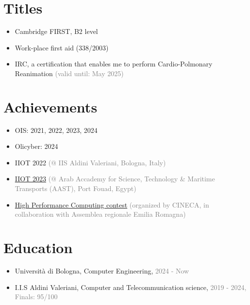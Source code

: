 \documentclass{paper}
\begin{document}
\section{Titles}

\begin{itemize}
    \item Cambridge FIRST, B2 level
    \item Work-place first aid (338/2003)
    \item IRC, a certification that enables me to perform Cardio-Polmonary Reanimation \textcolor{gray}{(valid until: May 2025)}
\end{itemize}

\section{Achievements}

\begin{itemize}
    \item OIS: 2021, 2022, 2023, 2024
    \item Olicyber: 2024

    \item IIOT 2022 \textcolor{gray}{(@ IIS Aldini Valeriani, Bologna, Italy)}
    \item \href{https://forum.olinfo.it/t/iiot-2023-diary/8278}{IIOT 2023} \textcolor{gray}{(@ Arab Accademy for Science, Technology \& Maritime Transports (AAST), Port Fouad, Egypt)}

    \item \href{https://www.ilrestodelcarlino.it/bologna/cronaca/sfida-tra-studenti-sul-supercalcolo-vincono-le-scuole-aldini-valeriani-8638a766}{High Performance Computing contest} \textcolor{gray}{(organized by CINECA, in collaboration with Assemblea regionale Emilia Romagna)}
\end{itemize}

\section{Education}

\begin{itemize}
    \item Università di Bologna, Computer Engineering, \textcolor{gray}{2024 - Now}
    \item I.I.S Aldini Valeriani, Computer and Telecommunication science, \textcolor{gray}{2019 - 2024, Finals: 95/100}
\end{itemize}
\end{document}
